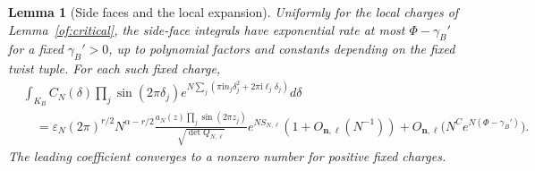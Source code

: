 \documentclass[11pt]{article}
\numberwithin{equation}{section}
\newtheorem{lemma}[theorem]{Lemma}
\theoremstyle{definition}\newtheorem{definition}[theorem]{Definition}
\theoremstyle{remark}\newtheorem{remark}[theorem]{Remark}
\newcommand{\ii}{\mathrm i}
\begin{document}
\begin{lemma}[Side faces and the local expansion]\label{of:local-integral}
Uniformly for the local charges of Lemma~\ref{of:critical}, the
side-face integrals have exponential rate at most $\Phi-\gamma_B'$
for a fixed $\gamma_B'>0$, up to polynomial factors and constants
depending on the fixed twist tuple. For each such fixed charge,
\begin{equation}\label{of:local-gaussian}
\begin{split}
 &\int_{K_B} C_N(\delta)\prod_j\sin(2\pi\delta_j)
           e^{N\sum_j(\pi\ii n_j\delta_j^2+2\pi\ii\ell_j\delta_j)}d\delta\\
 &\quad=\varepsilon_N(2\pi)^{r/2}N^{\alpha-r/2}
       \frac{a_N(z)\prod_j\sin(2\pi z_j)}{\sqrt{\det Q_{N,\ell}}}
       e^{NS_{N,\ell}}(1+O_{\boldsymbol n,\ell}(N^{-1}))
       +O_{\boldsymbol n,\ell}\bigl(N^C e^{N(\Phi-\gamma_B')}\bigr).
\end{split}
\end{equation}
The leading coefficient converges to a nonzero number for positive
fixed charges.
\end{lemma}
\end{document}
